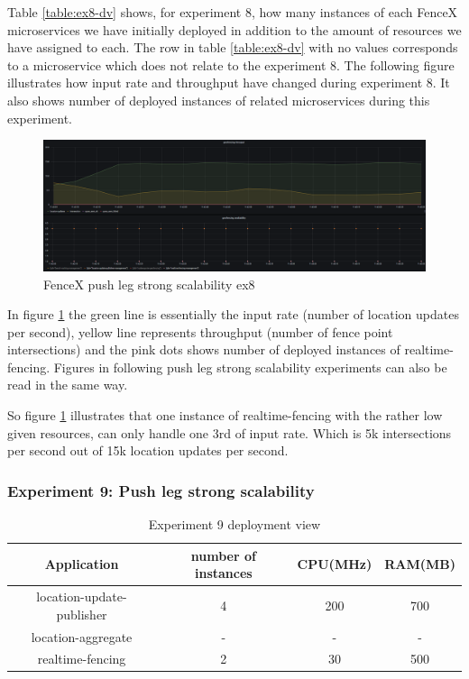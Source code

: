 \documentclass[a4]{report}
\begin{document}
    Table \ref{table:ex8-dv} shows, for experiment 8, how many instances of each FenceX microservices we have initially
    deployed in addition to the amount of resources we have assigned to each.
    The row in table \ref{table:ex8-dv} with no values corresponds to a microservice which does not relate to the
    experiment 8.
    The following figure illustrates how input rate and throughput have changed during experiment 8.
    It also shows number of deployed instances of related microservices during this experiment.

    \begin{figure}
        \caption{FenceX push leg strong scalability ex8}
        \label{fig:ex8}
        \includegraphics[scale=0.5]{images/evaluation/ex8-benchmarking-ongoing-2per4sec.png}
    \end{figure}

    \clearpage

    In figure \ref{fig:ex8} the green line is essentially the input rate (number of location updates per second),
    yellow line represents throughput (number of fence point intersections) and the pink dots shows number of
    deployed instances of realtime-fencing.
    Figures in following push leg strong scalability experiments can also be read in the same way.

    So figure \ref{fig:ex8} illustrates that one instance of realtime-fencing with the rather low given resources, can
    only handle one 3rd of input rate.
    Which is 5k intersections per second out of 15k location updates per second.

    \subsubsection{Experiment 9: Push leg strong scalability}
    \begin{table}[h!]
        \centering
        \begin{tabular}{|c|c|c|c|}
            \hline
            Application               & number of instances & CPU(MHz) & RAM(MB) \\
            \hline
            location-update-publisher & 4                   & 200      & 700     \\
            location-aggregate        & -                   & -        & -       \\
            realtime-fencing          & 2                   & 30       & 500     \\
            \hline
        \end{tabular}
        \caption{Experiment 9 deployment view}
        \label{table:ex9-dv}
    \end{table}
\end{document}
